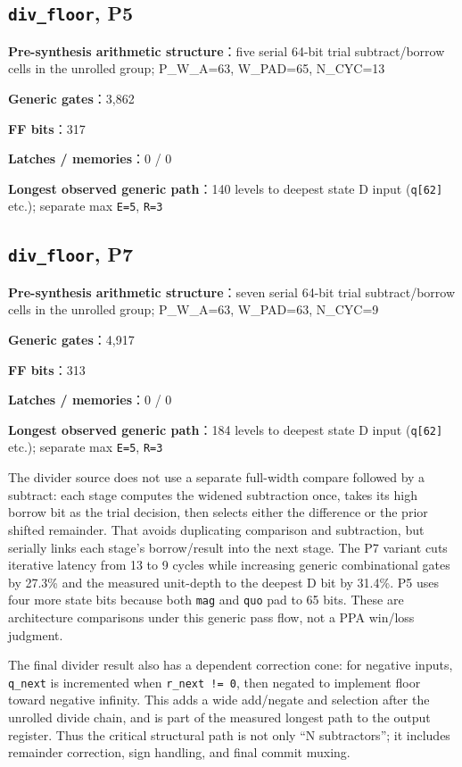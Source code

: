 \documentclass[UTF8,fontset=fandol,10pt,a4paper,openany]{ctexrep}
\newcommand{\code}[1]{\nolinkurl{#1}}
\begin{document}
\subsection*{\code{div_floor}, P5}
\noindent\textbf{Pre-synthesis arithmetic structure}：five serial 64-bit trial subtract/borrow cells in the unrolled group; P\_W\_A=63, W\_PAD=65, N\_CYC=13\par
\noindent\textbf{Generic gates}：3,862\par
\noindent\textbf{FF bits}：317\par
\noindent\textbf{Latches / memories}：0 / 0\par
\noindent\textbf{Longest observed generic path}：140 levels to deepest state D input (\code{q[62]} etc.); separate max \code{E=5}, \code{R=3}\par
\subsection*{\code{div_floor}, P7}
\noindent\textbf{Pre-synthesis arithmetic structure}：seven serial 64-bit trial subtract/borrow cells in the unrolled group; P\_W\_A=63, W\_PAD=63, N\_CYC=9\par
\noindent\textbf{Generic gates}：4,917\par
\noindent\textbf{FF bits}：313\par
\noindent\textbf{Latches / memories}：0 / 0\par
\noindent\textbf{Longest observed generic path}：184 levels to deepest state D input (\code{q[62]} etc.); separate max \code{E=5}, \code{R=3}\par


The divider source does not use a separate full-width compare followed by a subtract: each stage computes the widened subtraction once, takes its high borrow bit as the trial decision, then selects either the difference or the prior shifted remainder. That avoids duplicating comparison and subtraction, but serially links each stage's borrow/result into the next stage. The P7 variant cuts iterative latency from 13 to 9 cycles while increasing generic combinational gates by 27.3\% and the measured unit-depth to the deepest D bit by 31.4\%. P5 uses four more state bits because both \code{mag} and \code{quo} pad to 65 bits. These are architecture comparisons under this generic pass flow, not a PPA win/loss judgment.


The final divider result also has a dependent correction cone: for negative inputs, \code{q_next} is incremented when \code{r_next != 0}, then negated to implement floor toward negative infinity. This adds a wide add/negate and selection after the unrolled divide chain, and is part of the measured longest path to the output register. Thus the critical structural path is not only “N subtractors”; it includes remainder correction, sign handling, and final commit muxing.
\end{document}
